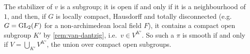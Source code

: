 \begin{definition}
\end{definition}
\noindent The stabilizer of $v$ is a subgroup; it is open if and only if it is a neighbourhood of $1$, and then, if $G$ is locally
compact, Hausdorff and totally disconnected (e.g.\ $G=\mathrm{GL}_2(F)$ for a non-archimedean local field $F$), it contains a compact open
subgroup $K'$ by \cref{rem:van-dantzig}, i.e.\ $v\in V^{K'}$. So such a $\pi$ is smooth if and only if $V=\bigcup_{K'}V^{K'}$, the
union over compact open subgroups.

\begin{definition}
\end{definition}
